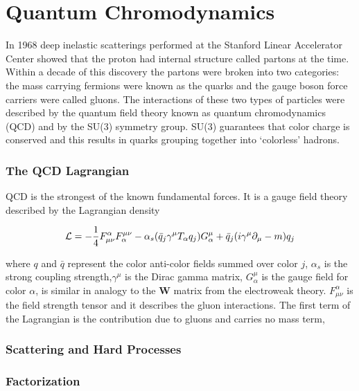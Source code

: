 
\chapter{Quantum Chromodynamics} \label{ch:qcd}
In 1968 deep inelastic scatterings performed at the Stanford Linear Accelerator Center showed that the proton had internal structure\cite{Riordan1287} called partons at the time.  Within a decade of this discovery the partons were broken into two categories: the mass carrying fermions were known as the quarks and the gauge boson force carriers were called gluons.  The interactions of these two types of particles were described by the quantum field theory known as quantum chromodynamics (QCD) and by the SU(3) symmetry group.  SU(3) guarantees that color charge is conserved and this results in quarks grouping together into `colorless' hadrons.

\subsection{The QCD Lagrangian}
QCD is the strongest of the known fundamental forces.  It is a gauge field theory described by the Lagrangian density

\begin{equation}
{\cal L}=-\frac{1}{4}F^{\alpha}_{\mu\nu}F^{\mu\nu}_{\alpha}
- \alpha_{s} (\bar{q}_{j}\gamma^{\mu}T_{\alpha}q_{j})G_{\alpha}^{\mu}
+ \bar{q}_{j}(i\gamma^{\mu} \partial_{\mu} - m)q_{j}
\label{eq:lagrangian}
\end{equation}

\noindent
where $q$ and $\bar{q}$ represent the color anti-color fields summed over color $j$, $\alpha_{s}$ is the strong coupling strength,$\gamma^{\mu}$ is the Dirac gamma matrix, $G_{\alpha}^{\mu}$ is the gauge field for color \textit{$\alpha$}, is similar in analogy to the \textbf{W} matrix from the electroweak theory.  $F^{\alpha}_{\mu\nu}$ is the field strength tensor and it describes the gluon interactions. The first term of the Lagrangian is the contribution due to gluons and carries no mass term, 
\subsection{Scattering and Hard Processes}




\subsection{Factorization}


